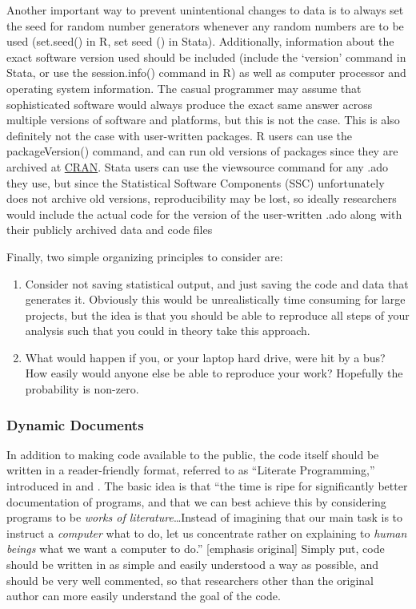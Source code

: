 \documentclass[12pt] {article}
\begin{document}
Another important way to prevent
unintentional changes to data is to always set the seed for random
number generators whenever any random numbers are to be used (set.seed()
in R, set seed () in Stata). Additionally, information about the exact
software version used should be included (include the `version' command in Stata, or use the
session.info() command in R) as well as computer processor and operating
system information. The casual programmer may assume that sophisticated
software would always produce the exact same answer across multiple
versions of software and platforms, but this is not the case. This is also definitely not the case with user-written packages. R users can use the packageVersion() command, and can run old versions of packages since they are archived at \href{http://cran.r-project.org}{CRAN}. Stata users can use the viewsource command for any .ado they use, but since the Statistical Software Components (SSC) unfortunately does not archive old versions, reproducibility may be lost, so ideally researchers would include the actual code for the version of the user-written .ado along with their publicly archived data and code files


Finally, two simple organizing principles to consider are:
\begin{enumerate}
\item 
 Consider not saving statistical output, and just saving the code and data that generates it. Obviously this would be unrealistically time consuming for large projects, but the idea is that you should be able to reproduce all steps of your analysis such that you could in theory take this approach.

\item
What would happen if you, or your laptop hard drive, were hit by a bus? How easily would anyone else be able to reproduce your work? Hopefully the probability is non-zero.
\end{enumerate}

\subsubsection{Dynamic Documents}\label{general-workflow-suggestions}

In addition to making code available to the public, the code itself
should be written in a reader-friendly format, referred to as ``Literate
Programming,'' introduced in \cite{knuth_literate_1984} and \cite{knuth_literate_1992}. The basic
idea is that ``the time is ripe for significantly better documentation
of programs, and that we can best achieve this by considering programs
to be \emph{works of literature}\ldots{}Instead of imagining that our
main task is to instruct a \emph{computer} what to do, let us
concentrate rather on explaining to \emph{human beings} what we want a
computer to do.'' {[}emphasis original{]} Simply put, code should be
written in as simple and easily understood a way as possible, and should
be very well commented, so that researchers other than the original
author can more easily understand the goal of the code.
\end{document}

